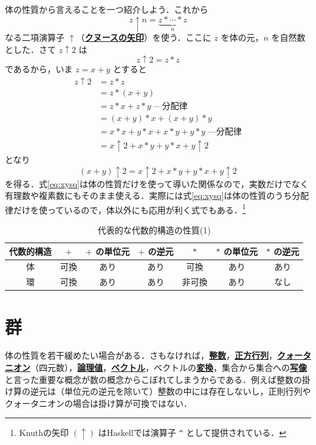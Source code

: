\documentclass[a4paper,twocolumn]{jsbook}
\newcommand{\programminglanguage}[1]{\textsf{#1}}
\newcommand{\haskell}{\programminglanguage{Haskell}}
\newcommand{\keyword}[1]{{\underline{\textbf{#1}}}}
\newcommand{\code}[1]{\texttt{#1}}
\begin{document}
体の性質から言えることを一つ紹介しよう．これから
\begin{equation}
z\uparrow n=\underbrace{z*\dotsb*z}_n
\end{equation}
なる二項演算子 $\uparrow$（\keyword{クヌースの矢印}）を使う．ここに $z$ を体の元，$n$ を自然数とした．さて $z\uparrow2$ は
\begin{equation}
z\uparrow2=z*z
\end{equation}
であるから，いま $z=x+y$ とすると
\begin{align}
z\uparrow2&=z*z\\
&=z*(x+y)\\
&=z*x+z*y\;\text{---分配律}\\
&=(x+y)*x+(x+y)*y\\
&=x*x+y*x+x*y+y*y\;\text{---分配律}\\
&=x\uparrow2+x*y+y*x+y\uparrow2
\end{align}
となり
\begin{equation}
\label{eq:xysq}
(x+y)\uparrow2=x\uparrow2+x*y+y*x+y\uparrow2
\end{equation}
を得る．式\eqref{eq:xysq}は体の性質だけを使って導いた関係なので，実数だけでなく有理数や複素数にもそのまま使える．実際には式\eqref{eq:xysq}は体の性質のうち分配律だけを使っているので，体以外にも応用が利く式でもある．\footnote{Knuthの矢印 $(\uparrow)$ は\haskell では演算子 \code{\^} として提供されている．}

\begin{table}
\caption{代表的な代数的構造の性質(1)}
\label{tab:field-and-ring}
\begin{center}
\begin{tabular}{||c||c|c|c|c|c|c||}
\hline
代数的構造&$+$&$+$ の単位元&$+$ の逆元&$*$&$*$ の単位元&$*$ の逆元\\
\hline\hline
体&可換&あり&あり&可換&あり&あり\\
環&可換&あり&あり&非可換&あり&なし\\
\hline
\end{tabular}
\end{center}
\end{table}

\section{群}

体の性質を若干緩めたい場合がある．さもなければ，\keyword{整数}，\keyword{正方行列}，\keyword{クォータニオン}（四元数），\keyword{論理値}，\keyword{ベクトル}，ベクトルの\keyword{変換}，集合から集合への\keyword{写像}と言った重要な概念が数の概念からこぼれてしまうからである．例えば整数の掛け算の逆元は（単位元の逆元を除いて）整数の中には存在しないし，正則行列やクォータニオンの場合は掛け算が可換ではない．
\end{document}
